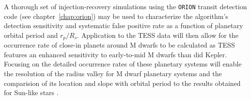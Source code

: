 A thorough set of injection-recovery simulations using the \texttt{ORION}
transit detection code (see chapter~\ref{chap:orion}) may be used to
characterize the algorithm's detection sensitivity and systematic false positive
rate as a function of planetary orbital period and $r_p/R_s$. Application to the
TESS data will then allow for the occurrence rate of close-in planets around M
dwarfs to be calculated as TESS features an enhanced sensitivity to early-to-mid
M dwarfs than did Kepler. Focusing on the detailed occurrence rates of these
planetary systems will enable the resolution of the radius valley for M dwarf
planetary systems and the comparision of its location and slope with orbital
period to the results obtained for Sun-like stars \citep{fulton18}.
